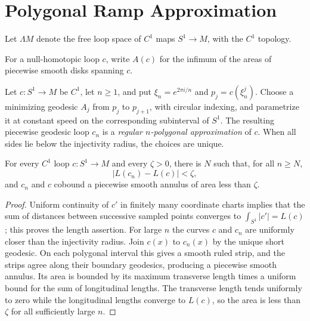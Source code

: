 \section{Polygonal Ramp Approximation}

Let $\Lambda M$ denote the free loop space of $C^1$ maps $S^1\to M$, with
the $C^1$ topology.

For a null-homotopic loop $c$, write $A(c)$ for the infimum of the areas of
piecewise smooth disks spanning $c$.

\begin{definition}
\label{def:regular-polygonal-loop-approximation}
\notready
Let $c\colon S^1\to M$ be $C^1$, let $n\ge1$, and put
$\xi_n=e^{2\pi i/n}$ and $p_j=c(\xi_n^j)$.  Choose a minimizing geodesic
$A_j$ from $p_j$ to $p_{j+1}$, with circular indexing, and parametrize it at
constant speed on the corresponding subinterval of $S^1$.  The resulting
piecewise geodesic loop $c_n$ is a \emph{regular $n$-polygonal approximation}
of $c$.  When all sides lie below the injectivity radius, the choices are
unique.
\end{definition}

\begin{theorem}
\label{lem:single-loop-polygonal-approximation}
\notready
For every $C^1$ loop $c\colon S^1\to M$ and every $\zeta>0$, there is
$N$ such that, for all $n\ge N$,
\[
 |L(c_n)-L(c)|<\zeta,
\]
and $c_n$ and $c$ cobound a piecewise smooth annulus of area less than
$\zeta$.
\end{theorem}
\begin{proof}
Uniform continuity of $c'$ in finitely many coordinate charts implies that
the sum of distances between successive sampled points converges to
$\int_{S^1}|c'|=L(c)$; this proves the length assertion.  For large $n$ the
curves $c$ and $c_n$ are uniformly closer than the injectivity radius.  Join
$c(x)$ to $c_n(x)$ by the unique short geodesic.  On each polygonal interval
this gives a smooth ruled strip, and the strips agree along their boundary
geodesics, producing a piecewise smooth annulus.  Its area is bounded by its
maximum transverse length times a uniform bound for the sum of longitudinal
lengths.  The transverse length tends uniformly to zero while the
longitudinal lengths converge to $L(c)$, so the area is less than $\zeta$
for all sufficiently large $n$.
\end{proof}

